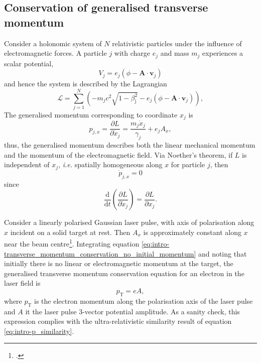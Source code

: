 \subsection{Conservation of generalised transverse momentum}\label{sec:intro_conservation-generalised-mometum}
Consider a holonomic system of $N$ relativistic particles under the influence of electromagnetic forces. A particle $j$ with charge $e_j$ and mass $m_j$ experiences a scalar potential,
\begin{equation}
		V_{j} = e_j(\phi - \mathbf{A} \cdot \mathbf{v}_{j})
\end{equation}
and hence the system is described by the Lagrangian \cite{goldsteinClassicalMechanics2013}
\begin{equation}
	\mathcal{L} = \sum^N_{j=1}\left( - m_jc^2\sqrt{1-\beta^2_\mathrm{j}} - e_j(\phi - \mathbf{A} \cdot \mathbf{v}_j) \right),
\end{equation}
The generalised momentum corresponding to coordinate $x_j$ is
\begin{equation}
	p_{j,x} = \frac{\partial L}{\partial \dot{x}_j} = \frac{m_j\dot{x}_j }{\gamma_j}+ e_jA_x,
\end{equation}
thus, the generalised momentum describes both the linear mechanical momentum and the momentum of the electromagnetic field. Via Noether's theorem, if $L$ is independent of $x_j$, \textit{i.e.} spatially homogeneous along $x$ for particle $j$, then 
\begin{equation}\label{eq:intro-transverse_momentum_differential_equation}
	\dot{p}_{j,x} = 0
\end{equation}
since
\begin{equation}
	\frac{\mathrm{d}}{\mathrm{d}t}\left(\frac{\partial L}{\partial \dot{x}_j}\right) = \frac{\partial L}{\partial x_j}.
\end{equation}

Consider a linearly polarised Gaussian laser pulse, with axis of polarisation along $x$ incident on a solid target at rest. Then $A_x$ is approximately constant along $x$ near the beam centre\footcite{Constant relative to the scale of typical electron trajectories in such an interaction.}. Integrating equation \ref{eq:intro-transverse_momentum_conservation_no_initial_momentum} and noting that initially there is no linear or electromagnetic momentum at the target, the generalised transverse momentum conservation equation for an electron in the laser field is
\begin{equation}\label{eq:intro-transverse_momentum_conservation_no_initial_momentum}
	p_\mathrm{T} = eA,
\end{equation}
where $p_\mathrm{T}$ is the electron momentum along the polarisation axis of the laser pulse and $A$ it the laser pulse 3-vector potential amplitude. As a sanity check, this expression complies with the ultra-relativistic similarity result of equation \ref{eq:intro-p_similarity}.

